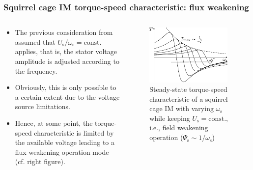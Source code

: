 \begin{frame}
	\frametitle{Squirrel cage IM torque-speed characteristic: flux weakening}
    \begin{columns}
		\begin{column}{0.5\textwidth}
	      \begin{itemize}
            \item The previous consideration from  assumed that $U_\mathrm{s}/\omega_\mathrm{s}=\mathrm{const.}$ applies, that is, the stator voltage amplitude is adjusted according to the frequency.
            \item Obviously, this is only possible to a certain extent due to the voltage source limitations.
            \item Hence, at some point, the torque-speed characteristic is limited by the available voltage leading to a flux weakening operation mode (cf. right figure).
          \end{itemize}
        \end{column}
        \begin{column}{0.5\textwidth}
            \begin{figure}
                \centering
                \includegraphics[width=0.95\textwidth]{fig/lec06/Kloss_formula_different_excitation_frequencies_field_weakening.pdf}
                \caption{Steady-state torque-speed characteristic of a squirrel cage IM with varying $\omega_\mathrm{s}$ while keeping $U_\mathrm{s}=\mathrm{const.}$, i.e., field weakening operation ($\Psi_\mathrm{s}\sim 1/\omega_\mathrm{s}$)} 
                \label{fig:Kloss_formula_different_excitation_frequencies_field_weakening}
            \end{figure}
        \end{column}
    \end{columns}
\end{frame}


